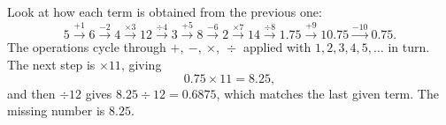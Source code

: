 Look at how each term is obtained from the previous one:
\[
5\xrightarrow{+1}6\xrightarrow{-2}4\xrightarrow{\times3}12\xrightarrow{\div4}3\xrightarrow{+5}8\xrightarrow{-6}2\xrightarrow{\times7}14\xrightarrow{\div8}1.75\xrightarrow{+9}10.75\xrightarrow{-10}0.75 .
\]
The operations cycle through $+,\ -,\ \times,\ \div$ applied with $1,2,3,4,5,\dots$ in turn. The next step is $\times11$, giving
\[
0.75\times11=8.25,
\]
and then $\div12$ gives $8.25\div12=0.6875$, which matches the last given term. The missing number is $\boxed{8.25}$.
